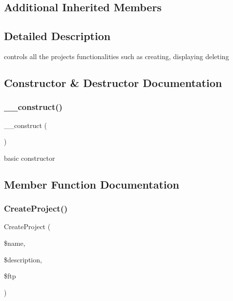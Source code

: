 \subsection*{Additional Inherited Members}


\subsection{Detailed Description}
controls all the project\textquotesingle{}s functionalities such as creating, displaying deleting 

\subsection{Constructor \& Destructor Documentation}
\mbox{\label{class_project_controller_a095c5d389db211932136b53f25f39685}} 
\subsubsection{\texorpdfstring{\+\_\+\+\_\+construct()}{\_\_construct()}}
{\footnotesize\ttfamily \+\_\+\+\_\+construct (\begin{DoxyParamCaption}{ }\end{DoxyParamCaption})}



basic constructor 



\subsection{Member Function Documentation}
\mbox{\label{class_project_controller_a05a2a3a4236fc494310ba8aa360655ed}} 
\subsubsection{\texorpdfstring{Create\+Project()}{CreateProject()}}
{\footnotesize\ttfamily Create\+Project (\begin{DoxyParamCaption}\item[{}]{\$name,  }\item[{}]{\$description,  }\item[{}]{\$ftp }\end{DoxyParamCaption})}



